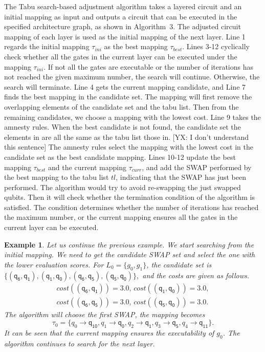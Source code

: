\documentclass[journal]{IEEEtran}
\newcommand{\yx}[1]{{\color{magenta} [YX: #1]}}
\newtheorem{example}{Example}
\begin{document}
	The Tabu search-based adjustment algorithm takes a layered circuit and an initial mapping as input and outputs a circuit that can be executed in the specified architecture graph, as shown in Algorithm~3. %
	The adjusted circuit mapping of each layer is used as the initial mapping of the next layer. 
	Line 1 regards the initial mapping $\tau_{ini}$ as the best mapping $\tau_{best}$. Lines 3-12 cyclically check whether all the gates in the current layer can be executed under the mapping $\tau_{ini}$. If not all the gates are executable or the number of iterations has not reached the given maximum number, the search will continue. Otherwise, the search will terminate. Line 4 gets the current mapping candidate, and Line 7 finds the best mapping in the candidate set. The mapping will first remove the overlapping elements of the candidate set and the tabu list. Then from the remaining candidates, we choose a mapping with the lowest cost. Line 9 takes the amnesty rules. When the best candidate is not found, the candidate set the elements in are all the same as the tabu list those in. \yx{I don't understand this sentence} The amnesty rules select the mapping with the lowest cost in the candidate set as the best candidate mapping. Lines 10-12 update the best mapping $\tau_{best}$ and the current mapping $\tau_{curr}$, and add the SWAP performed by the best mapping to the tabu list $tl$, indicating that the SWAP has just been performed. 
	The algorithm would try to avoid re-swapping the just swapped qubits. Then it will check whether the termination condition of the algorithm is satisfied. The condition determines whether the number of iterations has reached the maximum number, or the current mapping ensures all the gates in the current layer can be executed. 
\begin{example}
Let us continue the previous example. We start searching from the initial mapping. We need to get the candidate SWAP set and select the one with the lower evaluation scores.
For $L_{0}=\{g_{0},g_{1}\}$, the candidate set is 
$\{(\textsf{q}_\textsf{6},\textsf{q}_\textsf{1}), (\textsf{q}_\textsf{1},\textsf{q}_\textsf{0}), (\textsf{q}_\textsf{6},\textsf{q}_\textsf{5}), (\textsf{q}_\textsf{5},\textsf{q}_\textsf{0}) \} , $ and the costs are given as follows.
\[\begin{array}{l}
cost((\textsf{q}_\textsf{6},\textsf{q}_\textsf{1}))=3.0, \, cost((\textsf{q}_\textsf{1},\textsf{q}_\textsf{0}))=3.0,\\ cost((\textsf{q}_\textsf{6},\textsf{q}_\textsf{5}))=3.0, \, cost((\textsf{q}_\textsf{5},\textsf{q}_\textsf{0}))=3.0 .
\end{array}\]
The algorithm will choose the first SWAP, the mapping becomes $$\tau_{0}=\{\textit{q}_\textit{0}\rightarrow  \textsf{q}_\textsf{10},\textit{q}_\textit{1}\rightarrow  \textsf{q}_\textsf{0},
\textit{q}_\textit{2}\rightarrow  \textsf{q}_\textsf{1},\textit{q}_\textit{3}\rightarrow  \textsf{q}_\textsf{5},\textit{q}_\textit{4}\rightarrow  \textsf{q}_\textsf{11}\} . $$ 
 It can be seen that the current mapping ensures the executability of $g_{0}$. The algorithm continues to search for the next layer.
\end{example}
\end{document}
